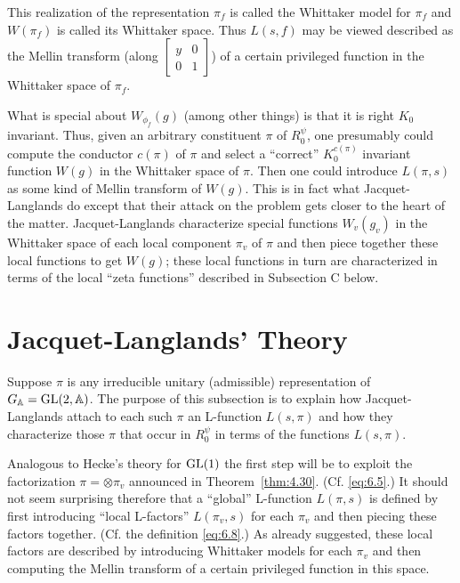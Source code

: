This realization of the representation $\pi_f$ is called the Whittaker model for $\pi_f$ and $W(\pi_f)$ is called its Whittaker space. Thus $L(s,f)$ may be viewed described as the Mellin transform (along $\begin{bmatrix} y & 0 \\ 0 & 1 \end{bmatrix}$) of a certain privileged function in the Whittaker space of $\pi_f$.

What is special about $W_{\phi_f}(g)$ (among other things) is that it is right $K_0$ invariant. Thus, given an arbitrary constituent $\pi$ of $R_0^{\psi}$, one presumably could compute the conductor $c(\pi)$ of $\pi$ and select a ``correct'' $K_0^{c(\pi)}$ invariant function $W(g)$ in the Whittaker space of $\pi$. Then one could introduce $L(\pi,s)$ as some kind of Mellin transform of $W(g)$. This is in fact what Jacquet-Langlands do except that their attack on the problem gets closer to the heart of the matter. Jacquet-Langlands characterize special functions $W_v(g_v)$ in the Whittaker space of each local component $\pi_v$ of $\pi$ and then piece together these local functions to get $W(g)$; these local functions in turn are characterized in terms of the local ``zeta functions'' described in Subsection C below.

\section{Jacquet-Langlands' Theory}\label{sec:6c}

Suppose $\pi$ is any irreducible unitary (admissible) representation of $G_{\mathbb{A}} = \operatorname{GL}(2, \mathbb{A})$. The purpose of this subsection is to explain how Jacquet-Langlands attach to each such $\pi$ an L-function $L(s, \pi)$ and how they characterize those $\pi$ that occur in $R_0^{\psi}$ in terms of the functions $L(s, \pi)$.

Analogous to Hecke's theory for $\operatorname{GL}(1)$ the first step will be to exploit the factorization $\pi = \otimes \pi_v$ announced in Theorem~\ref{thm:4.30}. (Cf. \eqref{eq:6.5}.) It should not seem surprising therefore that a ``global'' L-function $L(\pi, s)$ is defined by first introducing ``local L-factors'' $L(\pi_v, s)$ for each $\pi_v$ and then piecing these factors together. (Cf. the definition \eqref{eq:6.8}.) As already suggested, these local factors are described by introducing Whittaker models for each $\pi_v$ and then computing the Mellin transform of a certain privileged function in this space.

